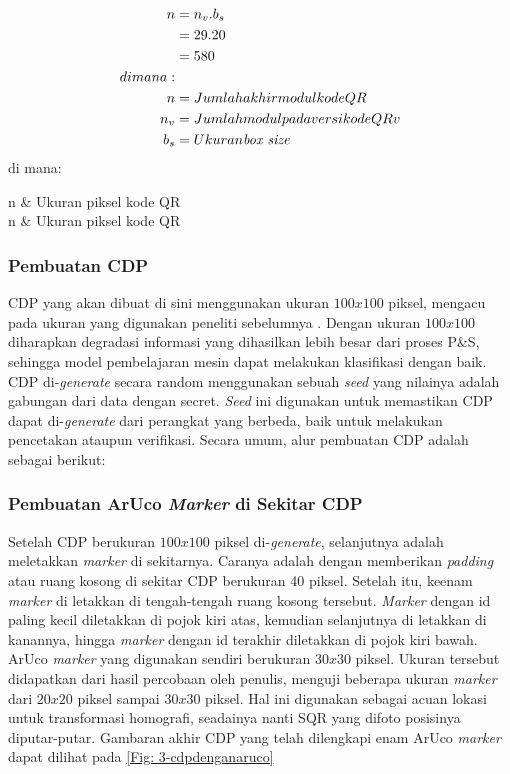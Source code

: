 \begin{align}
	n & = n_v.b_s \\&=29.20\nonumber\\&=580\nonumber\\di mana:\\n &= Jumlah akhir modul kode QR\\n_v &= Jumlah modul pada versi kode QR v\\b_s &= Ukuran \emph{box size}
\end{align}
di mana:

\begin{conditions*}
	n & Ukuran piksel kode QR\\
	n & Ukuran piksel kode QR
\end{conditions*}

\subsubsection{Pembuatan CDP}
CDP yang akan dibuat di sini menggunakan ukuran $100x100$ piksel, mengacu pada ukuran yang digunakan peneliti sebelumnya \cite{PICARDCANCOPYDETECTIONPATTERN}.
Dengan ukuran $100x100$ diharapkan degradasi informasi yang dihasilkan lebih besar dari proses P\&S, sehingga model pembelajaran mesin dapat melakukan
klasifikasi dengan baik. CDP di-\emph{generate} secara random menggunakan sebuah \emph{seed} yang nilainya adalah gabungan dari data dengan secret. \emph{Seed}
ini digunakan untuk memastikan CDP dapat di-\emph{generate} dari perangkat yang berbeda, baik untuk melakukan pencetakan ataupun verifikasi. Secara umum, alur
pembuatan CDP adalah sebagai berikut:

\subsubsection{Pembuatan ArUco \emph{Marker} di Sekitar CDP} Setelah CDP berukuran $100x100$ piksel di-\emph{generate}, selanjutnya adalah meletakkan \emph{marker} di sekitarnya. Caranya adalah dengan
memberikan \emph{padding} atau ruang kosong di sekitar CDP berukuran 40 piksel. Setelah itu, keenam \emph{marker} di letakkan di tengah-tengah ruang kosong
tersebut. \emph{Marker} dengan id paling kecil diletakkan di pojok kiri atas, kemudian selanjutnya di letakkan di kanannya, hingga \emph{marker} dengan id
terakhir diletakkan di pojok kiri bawah. ArUco \emph{marker} yang digunakan sendiri berukuran $30x30$ piksel. Ukuran tersebut didapatkan dari hasil percobaan
oleh penulis, menguji beberapa ukuran \emph{marker} dari $20x20$ piksel sampai $30x30$ piksel. Hal ini digunakan sebagai acuan lokasi untuk transformasi
homografi, seadainya nanti SQR yang difoto posisinya diputar-putar. Gambaran akhir CDP yang telah dilengkapi enam ArUco \emph{marker} dapat dilihat pada
\ref{Fig: 3-cdpdenganaruco}


